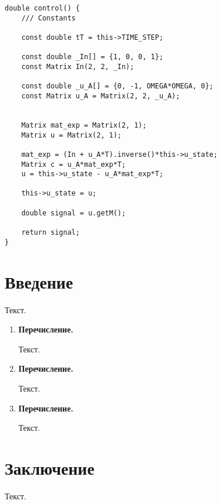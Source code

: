 \documentclass[14pt,a4paper]{extreport}
\begin{document}


\newpage

\begin{alltt}
\begin{verbatim}
double control() {
    /// Constants

    const double tT = this->TIME_STEP;

    const double _In[] = {1, 0, 0, 1};
    const Matrix In(2, 2, _In);

    const double _u_A[] = {0, -1, OMEGA*OMEGA, 0};
    const Matrix u_A = Matrix(2, 2, _u_A);


    Matrix mat_exp = Matrix(2, 1);
    Matrix u = Matrix(2, 1);

    mat_exp = (In + u_A*T).inverse()*this->u_state;
    Matrix c = u_A*mat_exp*T;
    u = this->u_state - u_A*mat_exp*T;

    this->u_state = u;

    double signal = u.getM();

    return signal;
}
\end{verbatim}
\end{alltt}

\newpage
\chapter*{Введение}

Текст.

\begin{enumerate}
    \item {\bfseries Перечисление.}
    
    Текст.
    \item {\bfseries Перечисление.}
    
    Текст.
    \item {\bfseries Перечисление.}
    
    Текст.
\end{enumerate}

\chapter*{Заключение}

Текст.
\end{document}
